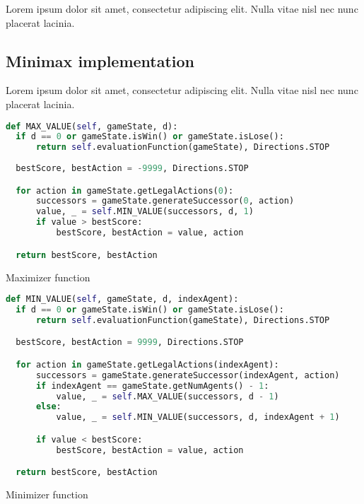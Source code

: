 \documentclass{article}
\begin{document}
Lorem ipsum dolor sit amet, consectetur adipiscing elit. Nulla vitae nisl nec nunc placerat lacinia.

\subsection{Minimax implementation}

Lorem ipsum dolor sit amet, consectetur adipiscing elit. Nulla vitae nisl nec nunc placerat lacinia.

\begin{table}[!ht]
\begin{lstlisting}[language=python, frame=tlbr, framesep=6pt, backgroundcolor=\color{light-gray}]
def MAX_VALUE(self, gameState, d):
  if d == 0 or gameState.isWin() or gameState.isLose():
      return self.evaluationFunction(gameState), Directions.STOP
  
  bestScore, bestAction = -9999, Directions.STOP

  for action in gameState.getLegalActions(0):
      successors = gameState.generateSuccessor(0, action)
      value, _ = self.MIN_VALUE(successors, d, 1)
      if value > bestScore:
          bestScore, bestAction = value, action

  return bestScore, bestAction
\end{lstlisting}
\caption{Maximizer function}
\end{table}

\begin{table}[!ht]
\begin{lstlisting}[language=python, frame=tlbr, framesep=6pt, backgroundcolor=\color{light-gray}]
def MIN_VALUE(self, gameState, d, indexAgent):
  if d == 0 or gameState.isWin() or gameState.isLose():
      return self.evaluationFunction(gameState), Directions.STOP

  bestScore, bestAction = 9999, Directions.STOP

  for action in gameState.getLegalActions(indexAgent):
      successors = gameState.generateSuccessor(indexAgent, action)
      if indexAgent == gameState.getNumAgents() - 1:
          value, _ = self.MAX_VALUE(successors, d - 1)
      else:
          value, _ = self.MIN_VALUE(successors, d, indexAgent + 1)

      if value < bestScore:
          bestScore, bestAction = value, action

  return bestScore, bestAction
\end{lstlisting}
\caption{Minimizer function}
\end{table}
\end{document}
